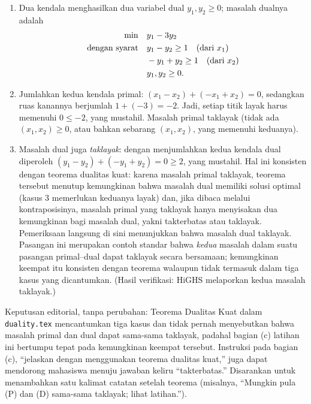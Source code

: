 \begin{enumerate}
\item Dua kendala menghasilkan dua variabel dual $y_1, y_2 \ge 0$; masalah dualnya adalah
\[
\begin{aligned}
\min \quad & y_1 - 3y_2 \\
\mbox{dengan syarat}\quad & y_1 - y_2 \ge 1 \quad \mbox{(dari } x_1\mbox{)} \\
& -y_1 + y_2 \ge 1 \quad \mbox{(dari } x_2\mbox{)} \\
& y_1, y_2 \ge 0 .
\end{aligned}
\]
\item Jumlahkan kedua kendala primal: $(x_1 - x_2) + (-x_1 + x_2) = 0$, sedangkan ruas kanannya berjumlah $1 + (-3) = -2$. Jadi, setiap titik layak harus memenuhi $0 \le -2$, yang mustahil. Masalah primal taklayak (tidak ada $(x_1, x_2) \ge 0$, atau bahkan sebarang $(x_1, x_2)$, yang memenuhi keduanya).
\item Masalah dual juga \emph{taklayak}: dengan menjumlahkan kedua kendala dual diperoleh $(y_1 - y_2) + (-y_1 + y_2) = 0 \ge 2$, yang mustahil. Hal ini konsisten dengan teorema dualitas kuat: karena masalah primal taklayak, teorema tersebut menutup kemungkinan bahwa masalah dual memiliki solusi optimal (kasus 3 memerlukan keduanya layak) dan, jika dibaca melalui kontraposisinya, masalah primal yang taklayak hanya menyisakan dua kemungkinan bagi masalah dual, yakni takterbatas atau taklayak. Pemeriksaan langsung di sini menunjukkan bahwa masalah dual taklayak. Pasangan ini merupakan contoh standar bahwa \emph{kedua} masalah dalam suatu pasangan primal--dual dapat taklayak secara bersamaan; kemungkinan keempat itu konsisten dengan teorema walaupun tidak termasuk dalam tiga kasus yang dicantumkan. (Hasil verifikasi: HiGHS melaporkan kedua masalah taklayak.)
\end{enumerate}

\begin{qaflag}
Keputusan editorial, tanpa perubahan: Teorema Dualitas Kuat dalam \texttt{duality.tex} mencantumkan tiga kasus dan tidak pernah menyebutkan bahwa masalah primal dan dual dapat sama-sama taklayak, padahal bagian (c) latihan ini bertumpu tepat pada kemungkinan keempat tersebut. Instruksi pada bagian (c), ``jelaskan dengan menggunakan teorema dualitas kuat,'' juga dapat mendorong mahasiswa menuju jawaban keliru ``takterbatas.'' Disarankan untuk menambahkan satu kalimat catatan setelah teorema (misalnya, ``Mungkin pula (P) dan (D) sama-sama taklayak; lihat latihan.'').
\end{qaflag}

